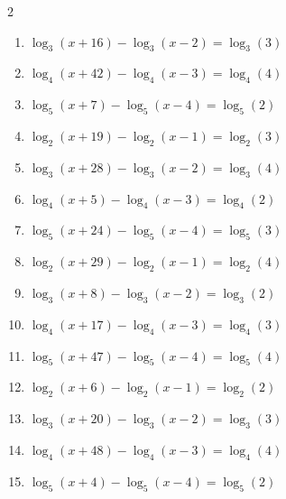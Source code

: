 \documentclass[12pt,a4paper]{article}
\begin{document}
\begin{multicols}{2}
\begin{enumerate}[leftmargin=*, itemsep=6pt]

\item \(\log_{3}\left(x+16\right) - \log_{3}\left(x-2\right)=\log_{3}\left(3\right)\)

\item \(\log_{4}\left(x+42\right) - \log_{4}\left(x-3\right)=\log_{4}\left(4\right)\)

\item \(\log_{5}\left(x+7\right) - \log_{5}\left(x-4\right)=\log_{5}\left(2\right)\)

\item \(\log_{2}\left(x+19\right) - \log_{2}\left(x-1\right)=\log_{2}\left(3\right)\)

\item \(\log_{3}\left(x+28\right) - \log_{3}\left(x-2\right)=\log_{3}\left(4\right)\)

\item \(\log_{4}\left(x+5\right) - \log_{4}\left(x-3\right)=\log_{4}\left(2\right)\)

\item \(\log_{5}\left(x+24\right) - \log_{5}\left(x-4\right)=\log_{5}\left(3\right)\)

\item \(\log_{2}\left(x+29\right) - \log_{2}\left(x-1\right)=\log_{2}\left(4\right)\)

\item \(\log_{3}\left(x+8\right) - \log_{3}\left(x-2\right)=\log_{3}\left(2\right)\)

\item \(\log_{4}\left(x+17\right) - \log_{4}\left(x-3\right)=\log_{4}\left(3\right)\)

\item \(\log_{5}\left(x+47\right) - \log_{5}\left(x-4\right)=\log_{5}\left(4\right)\)

\item \(\log_{2}\left(x+6\right) - \log_{2}\left(x-1\right)=\log_{2}\left(2\right)\)

\item \(\log_{3}\left(x+20\right) - \log_{3}\left(x-2\right)=\log_{3}\left(3\right)\)

\item \(\log_{4}\left(x+48\right) - \log_{4}\left(x-3\right)=\log_{4}\left(4\right)\)

\item \(\log_{5}\left(x+4\right) - \log_{5}\left(x-4\right)=\log_{5}\left(2\right)\)


\end{enumerate}
\end{multicols}
\end{document}
